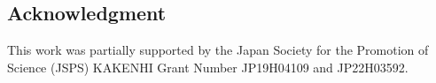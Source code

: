 \subsection*{Acknowledgment}
This work was partially supported by the Japan Society for the Promotion of
Science (JSPS) KAKENHI Grant Number JP19H04109 and JP22H03592.